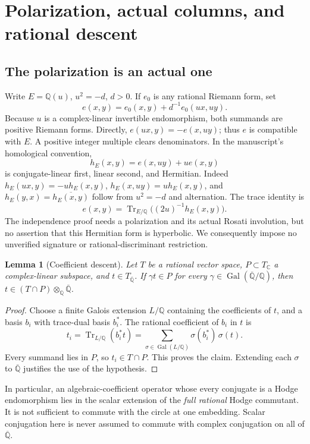 \documentclass[11pt]{article}
\newcommand{\Q}{\mathbb Q}
\newcommand{\C}{\mathbb C}
\newcommand{\kk}{{\overline{\mathbb Q}}}
\DeclareMathOperator{\Gal}{Gal}
\DeclareMathOperator{\Tr}{Tr}
\newtheorem{lemma}[theorem]{Lemma}
\theoremstyle{remark}
\begin{document}
\section{Polarization, actual columns, and rational descent}

\subsection{The polarization is an actual one}

Write $E=\Q(u)$, $u^2=-d$, $d>0$. If $e_0$ is any rational Riemann
form, set
\[
 e(x,y)=e_0(x,y)+d^{-1}e_0(ux,uy).
 \tag{2}\label{eq:average}
\]
Because $u$ is a complex-linear invertible endomorphism, both summands
are positive Riemann forms. Directly,
$e(ux,y)=-e(x,uy)$; thus $e$ is compatible with $E$.
A positive integer multiple clears denominators. In the manuscript's
homological convention,
\[
 h_E(x,y)=e(x,uy)+u e(x,y)
 \tag{3}
\]
is conjugate-linear first, linear second, and Hermitian. Indeed
$h_E(ux,y)=-u h_E(x,y)$, $h_E(x,uy)=u h_E(x,y)$, and
$h_E(y,x)=\overline{h_E(x,y)}$ follow from $u^2=-d$ and alternation.
The trace identity is
\[
 e(x,y)=\Tr_{E/\Q}\bigl((2u)^{-1}h_E(x,y)\bigr).
\]
The independence proof needs a polarization and its actual Rosati
involution, but no assertion that this Hermitian form is hyperbolic.
We consequently impose no unverified signature or rational-discriminant
restriction.

\begin{lemma}[Coefficient descent]\label{lem:descent}
Let $T$ be a rational vector space, $P\subset T_\C$ a complex-linear
subspace, and $t\in T_\kk$. If $\gamma t\in P$ for every
$\gamma\in\Gal(\kk/\Q)$, then
$t\in(T\cap P)\otimes_\Q\kk$.
\end{lemma}
\begin{proof}
Choose a finite Galois extension $L/\Q$ containing the coefficients
of $t$, and a basis $b_i$ with trace-dual basis $b_i^*$.
The rational coefficient of $b_i$ in $t$ is
\[
 t_i=\Tr_{L/\Q}(b_i^*t)
     =\sum_{\sigma\in\Gal(L/\Q)}\sigma(b_i^*)\,\sigma(t).
 \]
Every summand lies in $P$, so $t_i\in T\cap P$. This proves the claim.
Extending each $\sigma$ to $\kk$ justifies the use of the hypothesis.
\end{proof}

In particular, an algebraic-coefficient operator whose every conjugate
is a Hodge endomorphism lies in the scalar extension of the \emph{full
rational} Hodge commutant. It is not sufficient to commute with the
circle at one embedding. Scalar conjugation here is never assumed to
commute with complex conjugation on all of $\kk$.
\end{document}
